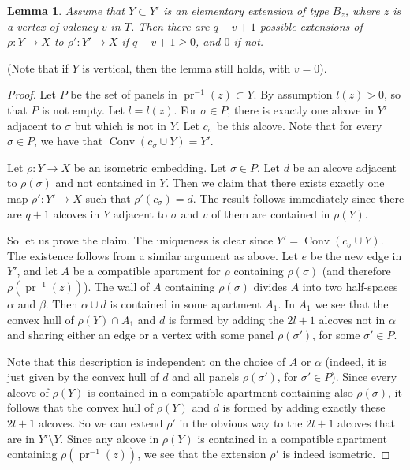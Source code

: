 \documentclass[a4paper, 11pt]{article}
\theoremstyle{plain}
\newtheorem{lemma}[proposition]{Lemma}
\theoremstyle{definition}
\theoremstyle{remark}
\DeclareMathOperator{\Conv}{Conv}
\DeclareMathOperator{\pr}{pr}
\begin{document}
\begin{lemma}\label{lem:extBz}
Assume that $Y\subset Y'$ is an elementary extension of type $B_z$, where $z$ is a vertex of valency $v$ in $T$. Then there are $q-v+1$ possible extensions of $\rho:Y\to X$ to $\rho':Y'\to X$ if $q-v+1\geq 0$, and $0$ if not. 
\end{lemma}

(Note that if $Y$ is vertical, then the lemma still holds, with $v=0$).


\begin{proof}
Let $P$ be the set of panels in $\pr^{-1}(z)\subset Y$. By assumption $l(z)>0$, so that $P$ is not empty. Let $l=l(z)$.
For $\sigma\in P$, there is exactly one alcove in $Y'$ adjacent to $\sigma$ but which is not in $Y$. Let $c_\sigma$ be this alcove. Note that for every $\sigma\in P$, we have that $\Conv(c_\sigma\cup Y)=Y'$.

Let $\rho:Y\to X$ be an isometric embedding. Let $\sigma\in P$. Let $d$ be an alcove adjacent to $\rho(\sigma)$ and not contained in $Y$. Then we claim that there exists exactly one map $\rho':Y'\to X$ such that $\rho'(c_\sigma)= d$. The result follows immediately since there are $q+1$ alcoves in $Y$ adjacent to $\sigma$ and $v$ of them are contained in $\rho(Y)$.

So let us prove the claim. The uniqueness is clear since $Y'=\Conv(c_\sigma\cup Y)$. The existence follows from a similar argument as above. Let $e$ be the new edge in $Y'$, and let $A$ be a compatible apartment for $\rho$ containing $\rho(\sigma)$ (and therefore $\rho(\pr^{-1}(z))$). The wall of $A$ containing $\rho(\sigma)$ divides $A$ into two half-spaces $\alpha$ and $\beta$. Then $\alpha\cup d$ is contained in some apartment $A_1$. In $A_1$ we see that the convex hull of $\rho(Y)\cap A_1$ and $d$ is formed by adding the $2l+1$ alcoves not in $\alpha$ and sharing either an edge or a vertex with some panel $\rho(\sigma')$, for some $\sigma'\in P$.

 Note that this description is independent on the choice of $A$ or $\alpha$ (indeed, it is just given by the convex hull of $d$ and all panels $\rho(\sigma')$, for $\sigma'\in P$).  Since every alcove of $\rho(Y)$ is contained in a compatible apartment containing also $\rho(\sigma)$, it follows that the convex hull of $\rho(Y)$ and $d$ is formed by adding exactly these $2l+1$ alcoves. So we can extend $\rho'$ in the obvious way to the $2l+1$ alcoves that are in $Y'\setminus Y$. Since any alcove in $\rho(Y)$ is contained in a compatible apartment containing $\rho(\pr^{-1}(z))$, we see that the extension $\rho'$ is indeed isometric. 
\end{proof}
\end{document}
